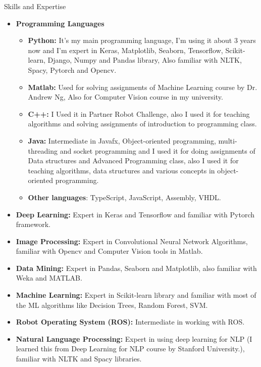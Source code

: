 \documentclass[]{mcdowellcv}
\begin{document}
    \begin{cvsection}{Skills and Expertise}
    	\begin{cvsubsection}{}{}{}
    	\end{cvsubsection}
    	\begin{itemize}
    	    \item \textbf{Programming Languages}
    	    \begin{itemize}
    	        \item \textbf{Python:} It's my main programming language, I'm using it about 3 years now and I'm expert in Keras, Matplotlib, Seaborn, Tensorflow, Scikit-learn, Django, Numpy and Pandas library, Also familiar with NLTK, Spacy, Pytorch and Opencv.
    	        \item \textbf{Matlab:} Used for solving assignments of Machine Learning course by Dr. Andrew Ng, Also for Computer Vision course in my university. 
    	        \item \textbf{C++:} I Used it in Partner Robot Challenge, also I used it for teaching algorithms and solving assignments of introduction to programming class. 
    	        \item \textbf{Java:} Intermediate in Javafx, Object-oriented programming, multi-threading and socket programming and I used it for doing assignments of Data structures and Advanced Programming class, also I used it for teaching algorithms, data structures and various concepts in object-oriented programming.
    	        \item \textbf{Other languages}: TypeScript, JavaScript, Assembly, VHDL.
    	    \end{itemize}
    	    \item \textbf{Deep Learning:} Expert in Keras and Tensorflow and familiar with Pytorch framework.
    	    \item \textbf{Image Processing:} Expert in Convolutional Neural Network Algorithms, familiar with Opencv and Computer Vision tools in Matlab.
    	    \item \textbf{Data Mining:} Expert in Pandas, Seaborn and Matplotlib, also familiar with Weka and MATLAB.
    	    \item \textbf{Machine Learning:} Expert in Scikit-learn library and familiar with most of the ML algorithms like Decision Trees, Random Forest, SVM.
    	    \item \textbf{Robot Operating System (ROS):} Intermediate in working with ROS.
    	    \item \textbf{Natural Language Processing:} Expert in using deep learning for NLP (I learned this from Deep Learning for NLP course by Stanford University.), familiar with NLTK and Spacy libraries.

\end{itemize}
\end{cvsection}
\end{document}
